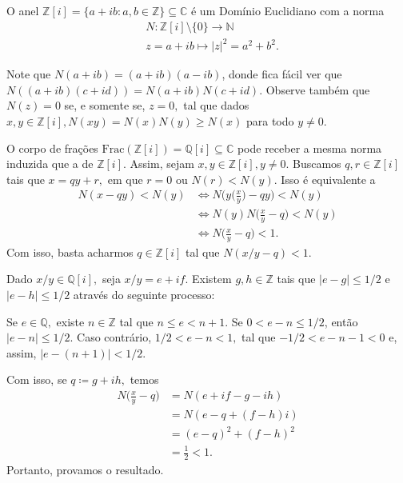 \documentclass[algebraII_notes.tex]{subfiles}
\begin{document}
\begin{theorem*}
	O anel \(\mathbb{Z}[i] = \{a + ib: a, b\in \mathbb{Z}\}\subseteq{\mathbb{C}}\) é um Domínio Euclidiano com a norma
	\begin{align*}
		 & N:\mathbb{Z}[i]\setminus{\{0\}}\rightarrow \mathbb{N} \\
		 & z = a + ib\mapsto |z|^{2} = a^{2} + b^{2}.
	\end{align*}
\end{theorem*}
\begin{proof*}
	Note que \(N(a+ib) = (a+ib)(a-ib)\), donde fica fácil ver que \(N((a+ib)(c+id)) = N(a+ib)N(c+id)\).
	Observe também que \(N(z) = 0\) se, e somente se, \(z = 0,\) tal que dados \(x, y\in \mathbb{Z}[i], N(xy) = N(x)N(y)
	\geq N(x)\) para todo \(y\neq0\).

	O corpo de frações \(\mathrm{Frac}(\mathbb{Z}[i]) = \mathbb{Q}[i] \subseteq{\mathbb{C}}\) pode receber a mesma norma
	induzida que a de \(\mathbb{Z}[i]\). Assim, sejam \(x, y\in \mathbb{Z}[i], y\neq0.\) Buscamos \(q, r\in \mathbb{Z}[i]\) tais que
	\(x = qy + r,\) em que \(r=0\) ou \(N(r) < N(y)\). Isso é equivalente a
	\begin{align*}
		N(x-qy) < N(y) & \Longleftrightarrow N \biggl(y \biggl(\frac{x}{y}\biggr) - qy\biggr) < N(y) \\
		               & \Longleftrightarrow N(y) N \biggl(\frac{x}{y}-q\biggr) < N(y)               \\
		               & \Longleftrightarrow N \biggl(\frac{x}{y} - q\biggr) < 1.
	\end{align*}
	Com isso, basta acharmos \(q\in \mathbb{Z}[i]\) tal que \(N(x/y - q) < 1.\)

	Dado \(x/y\in \mathbb{Q}[i],\) seja \(x/y = e + if.\) Existem \(g, h\in \mathbb{Z}\)
	tais que \(|e-g|\leq 1/2\) e \(|e-h|\leq 1/2\) através do seguinte processo:

	Se \(e\in \mathbb{Q},\) existe \(n\in \mathbb{Z}\) tal que \(n\leq e < n+1.\) Se \(0 < e-n\leq 1/2\),
	então \(|e-n|\leq 1/2\). Caso contrário, \(1/2 < e-n < 1,\) tal que \(-1/2 < e - n - 1 < 0\) e, assim,
	\(|e-(n+1)| < 1/2\).

	Com isso, se \(q\coloneqq g + ih,\) temos
	\begin{align*}
		N \biggl(\frac{x}{y} - q\biggr) & = N(e + if - g - ih)    \\
		                                & = N(e - q + (f-h)i)     \\
		                                & = (e-q)^{2} + (f-h)^{2} \\
		                                & =\frac{1}{2} < 1.
	\end{align*}
	Portanto, provamos o resultado. \qedsymbol
\end{proof*}
\end{document}
